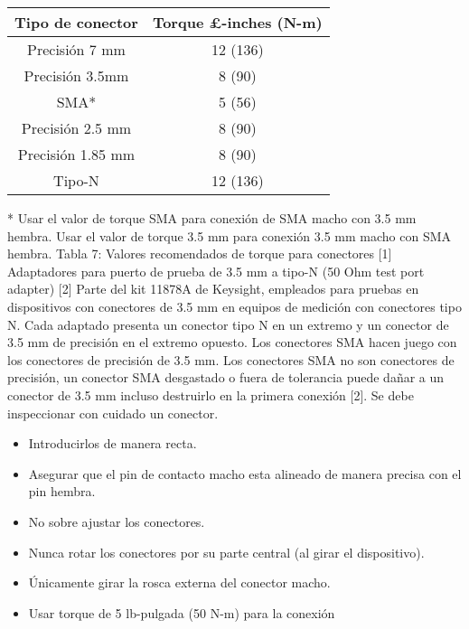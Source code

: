 \begin{table}[h!]
	\centering
	\begin{tabular}{cc}
		\toprule
		{\bfseries Tipo de conector} 		& {\bfseries Torque \si{\pounds}-inches (\si{\newton}-\si{\meter})} 	\\
		\midrule
		Precisión 7 \si{\milli\meter} 		& 	12 (136) 		\\
		Precisión 3.5\si{\milli\meter}		& 	8 (90)			\\
		SMA*								& 	5 (56)			\\
		Precisión 2.5 \si{\milli\meter}		& 	8 (90)			\\
		Precisión 1.85 \si{\milli\meter}	& 	8 (90)			\\
		Tipo-N								&	12 (136)		\\		
		\bottomrule
	\end{tabular}
\end{table}

* Usar el valor de torque SMA para conexión de SMA macho con 3.5 mm hembra. Usar el valor de torque 3.5 mm para conexión 3.5 mm macho con SMA hembra.
Tabla 7: Valores recomendados de torque para conectores [1]
Adaptadores para puerto de prueba de 3.5 mm a tipo-N (50 Ohm test port adapter) [2]
Parte del kit 11878A de Keysight, empleados para pruebas en dispositivos con conectores de 3.5 mm en equipos de medición con conectores tipo N. Cada adaptado presenta un conector tipo N en un extremo y un conector de 3.5 mm de precisión en el extremo opuesto.
Los conectores SMA hacen juego con los conectores de precisión de 3.5 mm. Los conectores SMA no son conectores de precisión, un conector SMA desgastado o fuera de tolerancia puede dañar a un conector de 3.5 mm incluso destruirlo en la primera conexión [2]. Se debe inspeccionar con cuidado un conector.

\begin{itemize}
	\item Introducirlos de manera recta.
	\item Asegurar que el pin de contacto macho esta alineado de manera precisa con el pin hembra.
	\item No sobre ajustar los conectores.
	\item Nunca rotar los conectores por su parte central (al girar el dispositivo).
	\item Únicamente girar la rosca externa del conector macho.
	\item Usar torque de 5 lb-pulgada (50 \si{\newton}-\si{\meter}) para la conexión

\end{itemize}


